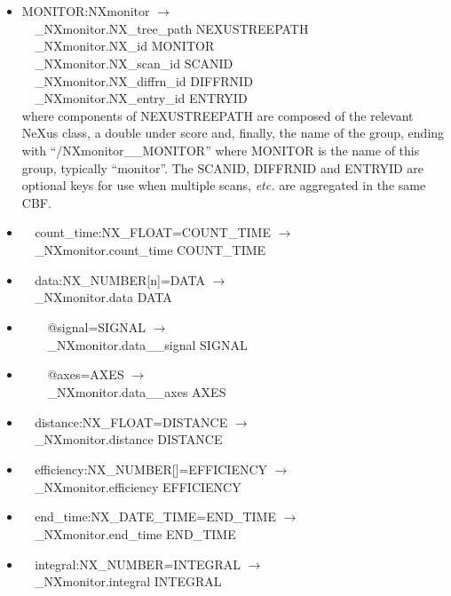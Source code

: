 \documentclass[11pt]{article}
\begin{document}
{{\begin{itemize}
\item{MONITOR:NXmonitor $\rightarrow$\\
\verb|  |\_NXmonitor.NX\_tree\_path    NEXUSTREEPATH \\
\verb|  |\_NXmonitor.NX\_id            MONITOR\\
\verb|  |\_NXmonitor.NX\_scan\_id      SCANID \\
\verb|  |\_NXmonitor.NX\_diffrn\_id    DIFFRNID \\
\verb|  |\_NXmonitor.NX\_entry\_id     ENTRYID \\
where components of NEXUSTREEPATH are composed of the
relevant NeXus class, a double under score and, finally, the
name of the group, ending with ``/NXmonitor\_\_MONITOR''
where MONITOR is the name of this group, typically ``monitor''.
The SCANID, DIFFRNID and ENTRYID are optional keys for use
when multiple scans, {\it etc.} are aggregated in the same CBF.}

\item{\verb|  |count\_time:NX\_FLOAT=COUNT\_TIME $\rightarrow$\\
\verb|  |\_NXmonitor.count\_time COUNT\_TIME}

\item{\verb|  |data:NX\_NUMBER[n]=DATA $\rightarrow$\\
\verb|  |\_NXmonitor.data DATA}

\item{\verb|    |@signal=SIGNAL $\rightarrow$\\
\verb|    |\_NXmonitor.data\_\_signal SIGNAL}

\item{\verb|    |@axes=AXES $\rightarrow$\\
\verb|    |\_NXmonitor.data\_\_axes AXES}

\item{\verb|  |distance:NX\_FLOAT=DISTANCE $\rightarrow$\\
\verb|  |\_NXmonitor.distance DISTANCE}

\item{\verb|  |efficiency:NX\_NUMBER[]=EFFICIENCY $\rightarrow$\\
\verb|  |\_NXmonitor.efficiency EFFICIENCY}

\item{\verb|  |end\_time:NX\_DATE\_TIME=END\_TIME $\rightarrow$\\
\verb|  |\_NXmonitor.end\_time END\_TIME}

\item{\verb|  |integral:NX\_NUMBER=INTEGRAL $\rightarrow$\\
\verb|  |\_NXmonitor.integral INTEGRAL}


\end{itemize}}}
\end{document}
